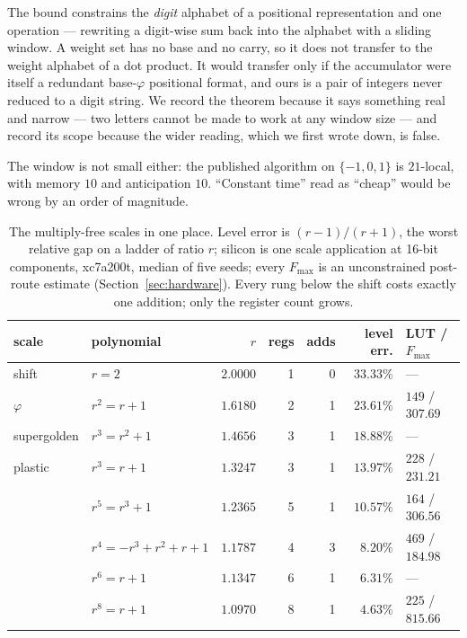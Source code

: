 \documentclass[11pt]{article}
\theoremstyle{definition}
\begin{document}
The bound constrains the \emph{digit} alphabet of a positional representation
and one operation --- rewriting a digit-wise sum back into the alphabet with a
sliding window. A weight set has no base and no carry, so it does not transfer
to the weight alphabet of a dot product. It would transfer only if the
accumulator were itself a redundant base-$\varphi$ positional format, and ours
is a pair of integers never reduced to a digit string. We record the theorem
because it says something real and narrow --- two letters cannot be made to work
at any window size --- and record its scope because the wider reading, which we
first wrote down, is false.

The window is not small either: the published algorithm on $\{-1,0,1\}$ is
$21$-local, with memory $10$ and anticipation $10$. ``Constant time'' read as
``cheap'' would be wrong by an order of magnitude.

\begin{table}[t]\centering
\caption{The multiply-free scales in one place. Level error is $(r-1)/(r+1)$,
the worst relative gap on a ladder of ratio $r$; silicon is one scale
application at 16-bit components, xc7a200t, median of five seeds; every
$F_{\max}$ is an unconstrained post-route estimate (Section~\ref{sec:hardware}). Every rung
below the shift costs exactly one addition; only the register count grows.}
\label{tab:allscales}
\begin{tabular}{llrrrrl}
\toprule
scale & polynomial & $r$ & regs & adds & level err. & LUT / $F_{\max}$ \\
\midrule
shift        & $r=2$              & $2.0000$ & 1 & 0 & $33.33\%$ & --- \\
$\varphi$    & $r^2=r+1$          & $1.6180$ & 2 & 1 & $23.61\%$ & $149$ / $307.69$ \\
supergolden  & $r^3=r^2+1$        & $1.4656$ & 3 & 1 & $18.88\%$ & --- \\
plastic      & $r^3=r+1$          & $1.3247$ & 3 & 1 & $13.97\%$ & $228$ / $231.21$ \\
             & $r^5=r^3+1$        & $1.2365$ & 5 & 1 & $10.57\%$ & $164$ / $306.56$ \\
             & $r^4{=}{-}r^3{+}r^2{+}r{+}1$ & $1.1787$ & 4 & 3 & $8.20\%$ & $469$ / $184.98$ \\
             & $r^6=r+1$          & $1.1347$ & 6 & 1 & $6.31\%$ & --- \\
             & $r^8=r+1$          & $1.0970$ & 8 & 1 & $4.63\%$ & $225$ / $815.66$ \\
\bottomrule
\end{tabular}
\end{table}
\end{document}
